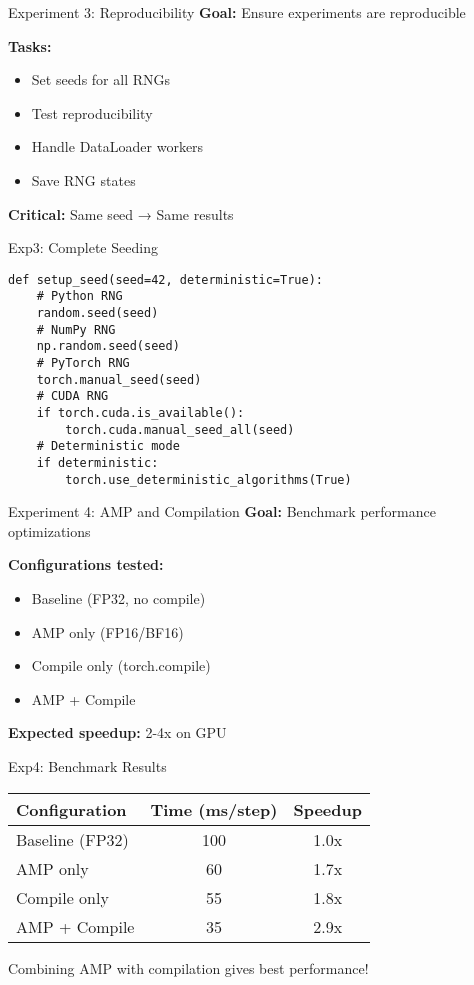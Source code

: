 \documentclass[aspectratio=169,10pt]{beamer}
\begin{document}
\begin{frame}{Experiment 3: Reproducibility}
\textbf{Goal:} Ensure experiments are reproducible

\textbf{Tasks:}
\begin{itemize}
    \item Set seeds for all RNGs
    \item Test reproducibility
    \item Handle DataLoader workers
    \item Save RNG states
\end{itemize}

\textbf{Critical:} Same seed → Same results
\end{frame}

\begin{frame}[fragile]{Exp3: Complete Seeding}
\begin{lstlisting}
def setup_seed(seed=42, deterministic=True):
    # Python RNG
    random.seed(seed)
    # NumPy RNG
    np.random.seed(seed)
    # PyTorch RNG
    torch.manual_seed(seed)
    # CUDA RNG
    if torch.cuda.is_available():
        torch.cuda.manual_seed_all(seed)
    # Deterministic mode
    if deterministic:
        torch.use_deterministic_algorithms(True)
\end{lstlisting}
\end{frame}

\begin{frame}{Experiment 4: AMP and Compilation}
\textbf{Goal:} Benchmark performance optimizations

\textbf{Configurations tested:}
\begin{itemize}
    \item Baseline (FP32, no compile)
    \item AMP only (FP16/BF16)
    \item Compile only (torch.compile)
    \item AMP + Compile
\end{itemize}

\textbf{Expected speedup:} 2-4x on GPU
\end{frame}

\begin{frame}{Exp4: Benchmark Results}
\begin{center}
\begin{tabular}{|l|c|c|}
\hline
\textbf{Configuration} & \textbf{Time (ms/step)} & \textbf{Speedup} \\
\hline
Baseline (FP32) & 100 & 1.0x \\
AMP only & 60 & 1.7x \\
Compile only & 55 & 1.8x \\
AMP + Compile & 35 & 2.9x \\
\hline
\end{tabular}
\end{center}

Combining AMP with compilation gives best performance!
\end{frame}
\end{document}
